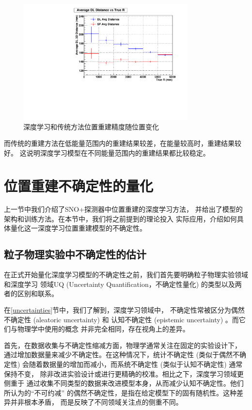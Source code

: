 \begin{figure}
    \centering
    \includegraphics[width=0.8\textwidth]{figures/r_vs_dist_profile.pdf}
    \caption{深度学习和传统方法位置重建精度随位置变化}
    \label{fig:_resolution}
\end{figure}

而传统的重建方法在低能量范围内的重建结果较差，在能量较高时，重建结果较好。
这说明深度学习模型在不同能量范围内的重建结果都比较稳定。 


\section{位置重建不确定性的量化}\label{sec:uncertainty}

上一节中我们介绍了SNO+探测器中位置重建的深度学习方法，
并给出了模型的架构和训练方法。在本节中，我们将之前提到的理论投入
实际应用，介绍如何具体量化这一深度学习位置重建模型的不确定性。

\subsection{粒子物理实验中不确定性的估计}

在正式开始量化深度学习模型的不确定性之前，我们首先要明确粒子物理实验领域和深度学习
领域UQ (Uncertainty Quantification，不确定性量化) 的类型以及两者的区别和联系\cite{ParticleDataGroup:2024cfk}。


在\ref{uncertainties}节中，我们了解到，深度学习领域中，
不确定性常被区分为偶然不确定性 (aleatoric uncertainty) 和
认知不确定性 (epistemic uncertainty) 。而它们与物理学中使用的概念
并非完全相同，存在视角上的差异。

首先，在数据收集与不确定性缩减方面，物理学通常关注在固定的实验设计下，
通过增加数据量来减少不确定性。在这种情况下，统计不确定性 (类似于偶然不确定性) 
会随着数据量的增加而减小，而系统不确定性 (类似于认知不确定性) 通常保持不变，
除非改进实验设计或进行更精确的校准。相比之下，深度学习领域更侧重于
通过收集不同类型的数据来改进模型本身，从而减少认知不确定性。他们所认为的“不可约减”
的偶然不确定性，是指在给定模型下的固有随机性。这种差异并非根本矛盾，
而是反映了不同领域关注点的侧重不同。

